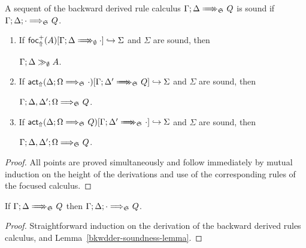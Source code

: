 \begin{definition}
  A sequent of the backward derived rule calculus
  $\zbneuseq{\Gamma}{\Delta}{\ctrlset{}}{Q}$
  is sound if $\Gamma; \Delta; \cdot \Longrightarrow_{\mathfrak{S}_{}} Q$.
\end{definition}

\begin{lemma}\label{bkwdder-soundness-lemma}
  \begin{enumerate}
  \item If $\brfrelj{A}{\zbneuseq{\Gamma}{\Delta}{\emptyset}{\cdot}}{\Sigma}$
    and $\Sigma$
    are sound, then

    $\Gamma; \Delta \gg_{\emptyset} A$.
  \item If
    $\bactrelj{\zsyseq{\Delta}{\Omega}{\ctrlset{}}{\cdot}}
    {\zbneuseq{\Gamma}{\Delta'}{\ctrlset{}}{Q}}{\Sigma}$
    and $\Sigma$ are sound, then

    $\Gamma; \Delta, \Delta'; \Omega \Longrightarrow_{\mathfrak{S}_{}} Q$.
  \item If
    $\bactrelj{\zsyseq{\Delta}{\Omega}{\ctrlset{}}{Q}}
    {\zbneuseq{\Gamma}{\Delta'}{\ctrlset{}}{\cdot}}{\Sigma}$
    and $\Sigma$ are sound, then

    $\Gamma; \Delta, \Delta'; \Omega \Longrightarrow_{\mathfrak{S}_{}} Q$.
  \end{enumerate}
\end{lemma}
\begin{proof}
  All points are proved simultaneously and follow immediately by mutual
  induction on the height of the derivations and use of the corresponding rules
  of the focused calculus.
\end{proof}

\begin{theorem}[Soundness]
  If $\zbneuseq{\Gamma}{\Delta}{\ctrlset{}}{Q}$ then
  $\Gamma; \Delta; \cdot \Longrightarrow_{\mathfrak{S}_{}} Q$.
\end{theorem}
\begin{proof}
  Straightforward induction on the derivation of the backward derived rules
  calculus, and Lemma~\ref{bkwdder-soundness-lemma}.
\end{proof}

